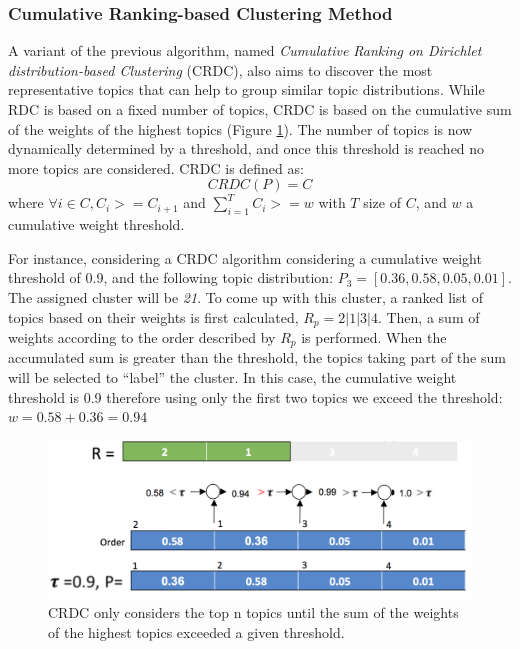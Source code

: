 \subsubsection{Cumulative Ranking-based Clustering Method}

A variant of the previous algorithm, named \textit{Cumulative Ranking on Dirichlet distribution-based Clustering} (CRDC), also aims to discover the most representative topics that can help to group similar topic distributions. While RDC is based on a fixed number of topics, CRDC is based on the cumulative sum of the weights of the highest topics (Figure \ref{fig:crdc-cluster}). The number of topics is now dynamically determined by a threshold, and once this threshold is reached no more topics are considered. CRDC is defined as:
\begin{equation}
CRDC(P)=C
\end{equation}
where  $\forall i \in C, C_i >=C_{i+1}$ and $\sum\limits_{i=1}^T C_i >= w$ with $T$ size of $C$, and $w$ a cumulative weight threshold.


For instance, considering a CRDC algorithm considering a cumulative weight threshold of 0.9, and the following topic distribution: $P_3=[0.36, 0.58, 0.05, 0.01]$. The assigned cluster will be \textit{21}. To come up with this cluster, a ranked list of topics based on their weights is first calculated, $R_p=2|1|3|4$. Then, a sum of weights according to the order described by $R_p$ is performed. When the accumulated sum is greater than the threshold, the topics taking part of the sum will be selected to ``label'' the cluster. In this case, the cumulative weight threshold is 0.9 therefore using only the first two topics we exceed the threshold: $w=0.58+0.36=0.94$

\begin{figure}
  \centering
  \includegraphics[scale=0.33]{crdc-cluster.png}
  \caption{CRDC only considers the top n topics until the sum of the weights of the highest topics exceeded a given threshold.}
  \label{fig:crdc-cluster}
\end{figure}


